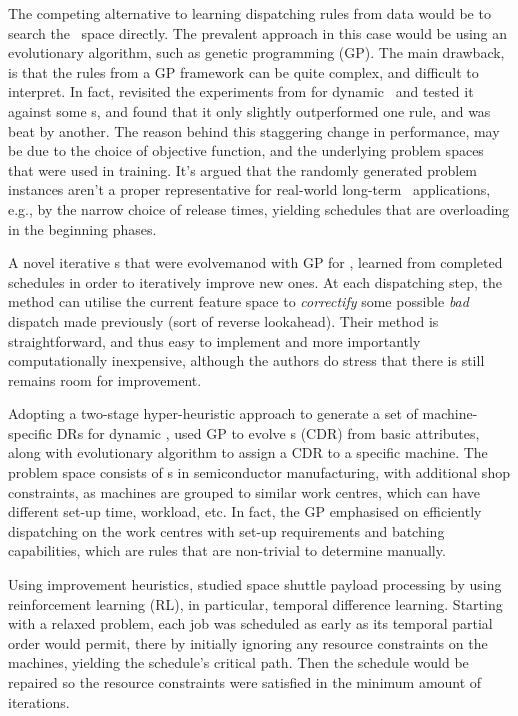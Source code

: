 \documentclass[smallextended]{svjour3}
\begin{document}
	
	The competing alternative to learning dispatching rules from data would be to 
	search the \dr\ space directly. The prevalent approach in this case would be 
	using an evolutionary algorithm, such as genetic programming (GP).
	The main drawback, is that the rules from a GP framework can be quite complex, 
	and difficult to interpret.
	In fact, \cite{Hildebrandt2010} revisited the experiments from \cite{Tay08} for 
	dynamic \jsp\ and tested it against some \sdr s, and 
	found that it only slightly outperformed one rule, and was beat by another. 
	The reason behind this staggering change in performance, may be due to 
	the choice of objective function, and the underlying problem spaces that were 
	used in training.
	It's argued that the randomly generated problem instances aren't a 
	proper representative for real-world long-term \jsp\ applications, e.g., by the 
	narrow choice of release times, yielding schedules that are overloading in the 
	beginning phases.
	
	A novel iterative \dr s that were evolvemanod with GP for \JSP, \cite{Nguyen13} 
	learned from completed schedules in order to iteratively improve new ones. 
	At each dispatching step, the method can utilise the current feature space to 
	\emph{correctify} some possible \emph{bad} dispatch made previously (sort of 
	reverse lookahead). Their method is straightforward, and thus easy to 
	implement and more importantly computationally inexpensive, although the 
	authors do stress that there is still remains room for improvement.
	
	Adopting a two-stage hyper-heuristic approach to generate a set of 
	machine-specific DRs for dynamic \jsp, \cite{Pickardt2013} used GP to evolve 
	\cdr s (CDR) from basic attributes, along with evolutionary algorithm to assign 
	a CDR to a specific machine. 
	The problem space consists of \jsp s in semiconductor manufacturing, with 
	additional shop constraints, as machines are grouped to similar work centres, 
	which can have different set-up time, workload, etc. 
	In fact, the GP emphasised on efficiently dispatching on the work 
	centres with set-up requirements and batching capabilities, which are rules 
	that are non-trivial to determine manually.
	
	
	Using improvement heuristics, \cite{Zhang95} studied space shuttle payload 
	processing by using reinforcement learning (RL), in particular, temporal 
	difference learning. 
	Starting with a relaxed problem, each job was scheduled as early as its 
	temporal partial order would permit, there by initially ignoring any resource 
	constraints on the machines, yielding the schedule's critical path. Then the 
	schedule would be repaired so the resource constraints were satisfied in the 
	minimum amount of iterations.
	
\end{document}
